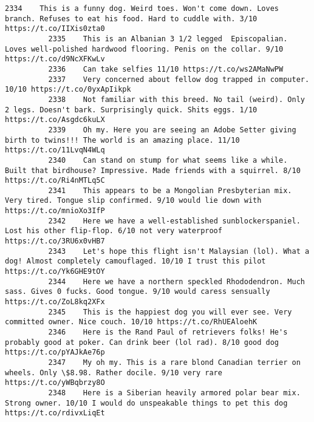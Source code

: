 \documentclass[11pt]{article}
\begin{document}
\begin{Verbatim}[commandchars=\\\{\}]
          2334    This is a funny dog. Weird toes. Won't come down. Loves branch. Refuses to eat his food. Hard to cuddle with. 3/10 https://t.co/IIXis0zta0                            
          2335    This is an Albanian 3 1/2 legged  Episcopalian. Loves well-polished hardwood flooring. Penis on the collar. 9/10 https://t.co/d9NcXFKwLv                              
          2336    Can take selfies 11/10 https://t.co/ws2AMaNwPW                                                                                                                        
          2337    Very concerned about fellow dog trapped in computer. 10/10 https://t.co/0yxApIikpk                                                                                    
          2338    Not familiar with this breed. No tail (weird). Only 2 legs. Doesn't bark. Surprisingly quick. Shits eggs. 1/10 https://t.co/Asgdc6kuLX                                
          2339    Oh my. Here you are seeing an Adobe Setter giving birth to twins!!! The world is an amazing place. 11/10 https://t.co/11LvqN4WLq                                      
          2340    Can stand on stump for what seems like a while. Built that birdhouse? Impressive. Made friends with a squirrel. 8/10 https://t.co/Ri4nMTLq5C                          
          2341    This appears to be a Mongolian Presbyterian mix. Very tired. Tongue slip confirmed. 9/10 would lie down with https://t.co/mnioXo3IfP                                  
          2342    Here we have a well-established sunblockerspaniel. Lost his other flip-flop. 6/10 not very waterproof https://t.co/3RU6x0vHB7                                         
          2343    Let's hope this flight isn't Malaysian (lol). What a dog! Almost completely camouflaged. 10/10 I trust this pilot https://t.co/Yk6GHE9tOY                             
          2344    Here we have a northern speckled Rhododendron. Much sass. Gives 0 fucks. Good tongue. 9/10 would caress sensually https://t.co/ZoL8kq2XFx                             
          2345    This is the happiest dog you will ever see. Very committed owner. Nice couch. 10/10 https://t.co/RhUEAloehK                                                           
          2346    Here is the Rand Paul of retrievers folks! He's probably good at poker. Can drink beer (lol rad). 8/10 good dog https://t.co/pYAJkAe76p                               
          2347    My oh my. This is a rare blond Canadian terrier on wheels. Only \$8.98. Rather docile. 9/10 very rare https://t.co/yWBqbrzy8O                                          
          2348    Here is a Siberian heavily armored polar bear mix. Strong owner. 10/10 I would do unspeakable things to pet this dog https://t.co/rdivxLiqEt                          

\end{Verbatim}
\end{document}
